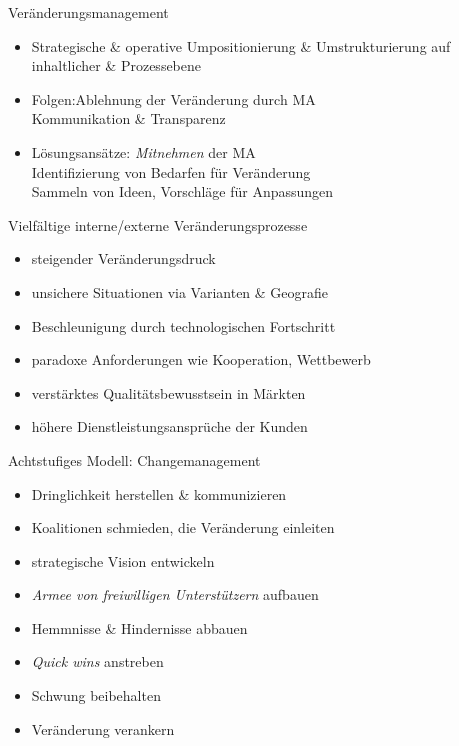 \documentclass{cheatsheet}
\begin{document}
    \begin{sectionbox}{Veränderungsmanagement}
        \begin{itemize}
            \item Strategische \& operative Umpositionierung \&  Umstrukturierung auf inhaltlicher \& Prozessebene 
            \item Folgen:Ablehnung der Veränderung durch MA\\
            \ra Kommunikation \& Transparenz
            \item Lösungsansätze: \emph{Mitnehmen} der MA\\
            \ra Identifizierung von Bedarfen für Veränderung\\
            \ra Sammeln von Ideen, Vorschläge für Anpassungen
        \end{itemize}
    \end{sectionbox}
    \begin{hintbox}{Vielfältige interne/externe Veränderungsprozesse }
        \begin{itemize}
            \item steigender Veränderungsdruck
            \item unsichere Situationen via Varianten \& Geografie
            \item Beschleunigung durch technologischen Fortschritt
            \item paradoxe Anforderungen wie Kooperation, Wettbewerb
            \item verstärktes Qualitätsbewusstsein in Märkten
            \item höhere Dienstleistungsansprüche der Kunden
        \end{itemize}
    \end{hintbox}
    \begin{sectionbox}{Achtstufiges Modell: Changemanagement}
        \begin{itemize}
            \item Dringlichkeit herstellen \& kommunizieren
            \item Koalitionen schmieden, die Veränderung einleiten
            \item strategische Vision entwickeln
            \item \emph{Armee von freiwilligen Unterstützern} aufbauen
            \item Hemmnisse \& Hindernisse abbauen
            \item \emph{Quick wins} anstreben
            \item Schwung beibehalten
            \item Veränderung verankern
        \end{itemize}
    \end{sectionbox}
\end{document}
